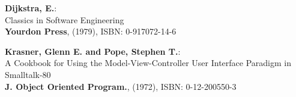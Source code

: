 \documentclass[
]{elteikthesis}[2023/04/10]
\begin{document}
\label{bib:dijkstra1979goto}
\textbf{Dijkstra, E.}:\\
Classics in Software Engineering\\
\textbf{Yourdon Press}, (1979), ISBN: 0-917072-14-6

\label{bib:krasner1988mvc}
\textbf{Krasner, Glenn E. and Pope, Stephen T.}:\\
A Cookbook for Using the Model-View-Controller User Interface Paradigm in Smalltalk-80\\
\textbf{J. Object Oriented Program.}, (1972), ISBN: 0-12-200550-3

\cleardoublepage





\end{document}
